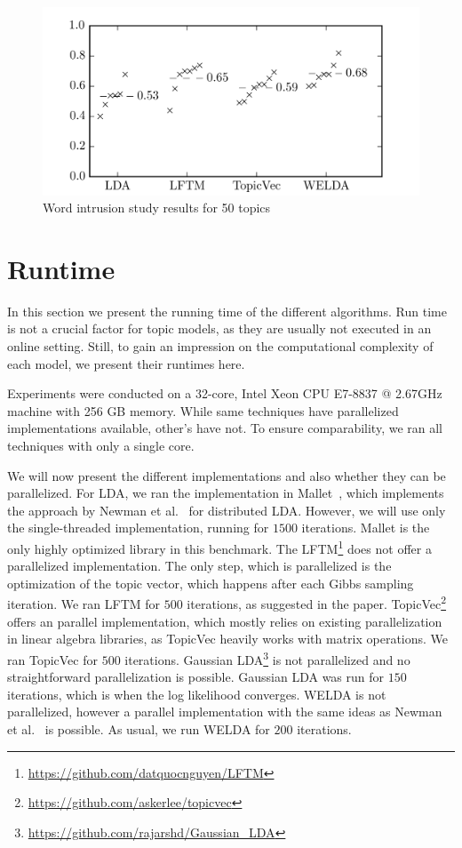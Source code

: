 \documentclass[
        a4paper,
        titlepage,
        twoside,
        parskip
        ]{scrbook}
\theoremstyle{break}
\begin{document}
\begin{figure}
       \centering
       \includegraphics[width=12cm]{figures/word_intrusion_50.png}
       \caption{Word intrusion study results for 50 topics}
       \label{fig:word_intrusion_50}
\end{figure}

\section{Runtime}
\label{sec:runtime}

In this section we present the running time of the different algorithms.
Run time is not a crucial factor for topic models, as they are usually not executed in an online setting.
Still, to gain an impression on the computational complexity of each model, we present their runtimes here.

Experiments were conducted on a 32-core, Intel Xeon CPU E7-8837 @ 2.67GHz machine with 256 GB memory.
While same techniques have parallelized implementations available, other's have not.
To ensure comparability, we ran all techniques with only a single core.

We will now present the different implementations and also whether they can be parallelized.
For LDA, we ran the implementation in Mallet~\cite{McCallum2002}, which implements the approach by Newman et al.~\cite{Newman2009} for distributed LDA.
However, we will use only the single-threaded implementation, running for $1500$ iterations.
Mallet is the only highly optimized library in this benchmark.
The LFTM\footnote{\url{https://github.com/datquocnguyen/LFTM}} does not offer a parallelized implementation.
The only step, which is parallelized is the optimization of the topic vector, which happens after each Gibbs sampling iteration.
We ran LFTM for $500$ iterations, as suggested in the paper.
TopicVec\footnote{\url{https://github.com/askerlee/topicvec}} offers an parallel implementation, which mostly relies on existing parallelization in linear algebra libraries, as TopicVec heavily works with matrix operations.
We ran TopicVec for $500$ iterations.
Gaussian LDA\footnote{\url{https://github.com/rajarshd/Gaussian_LDA}} is not parallelized and no straightforward parallelization is possible.
Gaussian LDA was run for $150$ iterations,  which is when the log likelihood converges.
WELDA is not parallelized, however a parallel implementation with the same ideas as Newman et al.~\cite{Newman2009} is possible.
As usual, we run WELDA for $200$ iterations.
\end{document}
